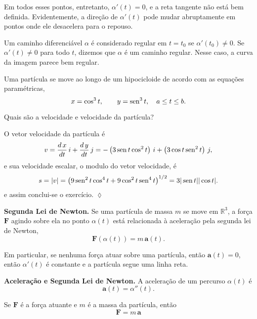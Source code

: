 Em todos esses pontos, entretanto, $\alpha'(t) = 0$, e a reta tangente não está bem definida. Evidentemente, a direção de $\alpha'(t)$ pode mudar
abruptamente em pontos onde ele desacelera para o repouso.

Um caminho diferenciável $\alpha$ é considerado regular em $t=t_{0}$ se $\alpha'(t_{0}) \neq 0$. Se $\alpha'(t) \neq 0$ para todo $t$, dizemos que
$\alpha$ é um caminho regular. Nesse caso, a curva da imagem parece bem regular.

\begin{exc}
Uma partícula se move ao longo de um hipocicloide de acordo com as equações paramétricas,
\begin{equation*}
x = \cos^{3} t, \qquad  y = \operatorname{sen}^{3} t, \quad  a \leq  t \leq  b.
\end{equation*}

Quais são a velocidade e velocidade da partícula?
\end{exc}

\solo
O vetor velocidade da partícula é
\begin{equation*}
 v= \frac{d\, x}{dt}\,i+\frac{d\, y}{dt}\,j=-\left(3\operatorname{sen} t \cos^{2} t\right)\,i + \left(3 \cos t\operatorname{sen}^{2} t\right)\,j,
\end{equation*}
e sua velocidade escalar, o modulo do vetor velocidade, é
\begin{equation*}
s = |v| = \left(9\operatorname{sen}^{2} t \cos^{4} t + 9\cos^{2} t \operatorname{sen}^{4} t\right)^{1/2} = 3|\operatorname{sen} t||\cos t|.
\end{equation*}
e assim conclui-se o exercício. \hfill $\lozenge$

\noindent\textbf{Segunda Lei de Newton.}
Se uma partícula de massa $m$ se move em $\mathbb{R}^{3}$, a força $\mathbf{F}$ agindo sobre ela no ponto $\alpha(t)$ está relacionada à aceleração
pela segunda lei de Newton,
\begin{equation*}
\mathbf{F}(\alpha(t))=m\, \mathbf{a}(t).
\end{equation*}

Em particular, se nenhuma força atuar sobre uma partícula, então $\mathbf{a}(t)=0$, então $\alpha'(t)$ é constante e a partícula segue uma linha
reta.

\noindent\textbf{Aceleração e Segunda Lei de Newton.}
A aceleração de um percurso $\alpha(t)$ é
\begin{equation*}
  \mathbf{a}(t)=\alpha''(t).
\end{equation*}

Se $\mathbf{F}$ é a força atuante e $m$ é a massa da partícula, então
\begin{equation*}
  \mathbf{F}=m\, \mathbf{a}
\end{equation*}

